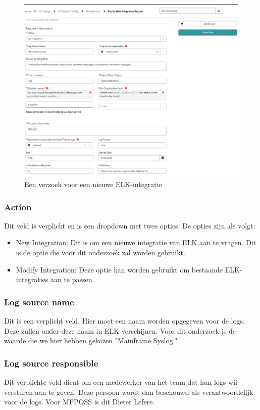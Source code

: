 \begin{figure}
    \centering
    \includegraphics[width=1\linewidth]{bachproef//graphics/Request.png}
    \caption{Een verzoek voor een nieuwe ELK-integratie}
    \label{fig:Een ServiceNow-verzoek om een nieuwe ELK-integratie te starten}
\end{figure}

\subsubsection{Action}
Dit veld is verplicht en is een dropdown met twee opties. De opties zijn als volgt:
\begin{itemize}
    \item New Integration: Dit is om een nieuwe integratie van ELK aan te vragen. Dit is de optie die voor dit onderzoek zal worden gebruikt.
    \item Modify Integration: Deze optie kan worden gebruikt om bestaande ELK-integraties aan te passen.
\end{itemize}

\subsubsection{Log source name}
Dit is een verplicht veld. Hier moet een naam worden opgegeven voor de logs. Deze zullen onder deze naam in ELK verschijnen. Voor dit onderzoek is de waarde die we hier hebben gekozen "Mainframe Syslog."

\subsubsection{Log source responsible}
Dit verplichte veld dient om een medewerker van het team dat hun logs wil versturen aan te geven. Deze persoon wordt dan beschouwd als verantwoordelijk voor de logs. Voor MFPOSS is dit Dieter Lefere.

